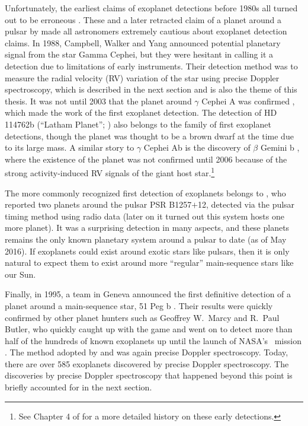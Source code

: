 Unfortunately, the earliest claims of exoplanet detections before
1980s all turned out to be erroneous \citep{1855MNRAS..15..228J,
1969AJ.....74..757V}. These and a later retracted claim of a planet
around a pulsar by \cite{1991Natur.352..311B} made all astronomers
extremely cautious about exoplanet detection claims. In 1988,
Campbell, Walker and Yang announced potential planetary signal from
the star Gamma Cephei, but they were hesitant in calling it a
detection due to limitations of early instruments. Their detection
method was to measure the radial velocity (RV) variation of the star
using precise Doppler spectroscopy, which is described in the next
section and is also the theme of this thesis.  It was not until 2003
that the planet around $\gamma$ Cephei A was confirmed
\citep{2003ApJ...599.1383H}, which made the work of
\cite{1988ApJ...331..902C} the first exoplanet detection. The
detection of HD 114762b (``Latham Planet'';
\citealt{1989Natur.339...38L}) also belongs to the family of first
exoplanet detections, though the planet was thought to be a brown
dwarf at the time due to its large mass. A similar story to $\gamma$
Cephei Ab is the discovery of $\beta$ Gemini b
\citep{1993ApJ...413..339H}, where the existence of the planet was not
confirmed until 2006 \citep{2006A&A...457..335H} because of the strong
activity-induced RV signals of the giant host star.\footnote{See
  Chapter 4 of \cite{2013pss3.book..489W} for a more detailed history
  on these early detections.} 

The more commonly recognized first detection of exoplanets belongs to
\cite{1993ApJ...413..339H}, who reported two planets around the pulsar
PSR B1257$+$12, detected via the pulsar timing method using radio data
(later on it turned out this system hosts one more planet). It was a
surprising detection in many aspects, and these planets remains the
only known planetary system around a pulsar to date (as of May
2016). If exoplanets could exist around exotic stars like pulsars,
then it is only natural to expect them to exist around more
``regular'' main-sequence stars like our Sun.

Finally, in 1995, a team in Geneva announced the first definitive
detection of a planet around a main-sequence star, 51 Peg b
\citep{1995Natur.378..355M}. Their results were quickly confirmed by
other planet hunters such as Geoffrey W.\ Marcy and R.\ Paul Butler,
who quickly caught up with the game \citep{1996ApJ...464L.153B} and
went on to detect more than half of the hundreds of known exoplanets
up until the launch of NASA's \kepler\ mission
\cite{2010Sci...327..977B}. The method adopted by
\cite{1995Natur.378..355M} and \cite{1996ApJ...464L.153B} was again
precise Doppler spectroscopy. Today, there are over 585 exoplanets
discovered by precise Doppler spectroscopy. The discoveries by precise
Doppler spectroscopy that happened beyond this point is briefly
accounted for in the next section. 

